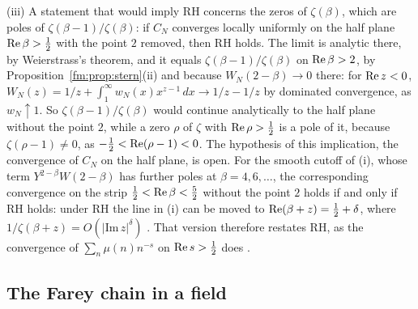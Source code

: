\begin{remark}
(iii) A statement that would imply RH concerns the zeros of $\zeta(\beta)$, which are poles of $\zeta(\beta-1)/\zeta(\beta)$: if $C_N$ converges locally uniformly on the half plane $\operatorname{Re}\beta>\frac12$ with the point $2$ removed, then RH holds. The limit is analytic there, by Weierstrass's theorem, and it equals $\zeta(\beta-1)/\zeta(\beta)$ on $\operatorname{Re}\beta>2$, by Proposition~\ref{fm:prop:stern}(ii) and because $W_N(2-\beta)\to0$ there: for $\operatorname{Re} z<0$, $W_N(z)=1/z+\int_1^\infty w_N(x)x^{z-1}\,dx\to1/z-1/z$ by dominated convergence, as $w_N\uparrow1$. So $\zeta(\beta-1)/\zeta(\beta)$ would continue analytically to the half plane without the point $2$, while a zero $\rho$ of $\zeta$ with $\operatorname{Re}\rho>\frac12$ is a pole of it, because $\zeta(\rho-1)\ne0$, as $-\frac12<\operatorname{Re}(\rho-1)<0$. The hypothesis of this implication, the convergence of $C_N$ on the half plane, is open. For the smooth cutoff of (i), whose term $Y^{2-\beta}W(2-\beta)$ has further poles at $\beta=4,6,\dots$, the corresponding convergence on the strip $\frac12<\operatorname{Re}\beta<\frac52$ without the point $2$ holds if and only if RH holds: under RH the line in (i) can be moved to $\operatorname{Re}(\beta+z)=\frac12+\delta$, where $1/\zeta(\beta+z)=O(|\mathrm{Im}\,z|^{\delta})$ \cite[Section~14.2]{Titchmarsh}. That version therefore restates RH, as the convergence of $\sum_n\mu(n)n^{-s}$ on $\operatorname{Re} s>\frac12$ does \cite[Section~14.25]{Titchmarsh}.
\end{remark}

\subsection{The Farey chain in a field}\label{fm:sec:farey}

